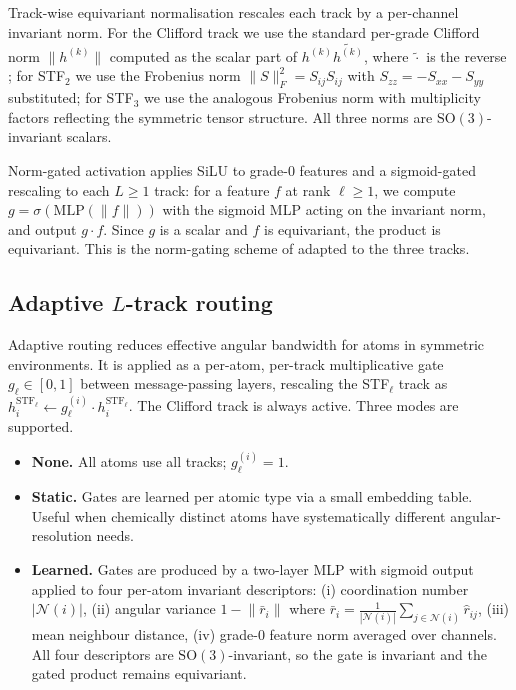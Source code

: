 Track-wise equivariant normalisation rescales each track by a per-channel invariant norm. For the Clifford track we use the standard per-grade Clifford norm $\lVert h^{(k)}\rVert$ computed as the scalar part of $h^{(k)}\widetilde{h^{(k)}}$, where $\widetilde{\cdot}$ is the reverse \citep{doran2003geometric}; for STF$_2$ we use the Frobenius norm $\lVert S\rVert_F^2 = S_{ij}S_{ij}$ with $S_{zz} = -S_{xx}-S_{yy}$ substituted; for STF$_3$ we use the analogous Frobenius norm with multiplicity factors reflecting the symmetric tensor structure. All three norms are $\mathrm{SO}(3)$-invariant scalars.

Norm-gated activation applies SiLU to grade-0 features and a sigmoid-gated rescaling to each $L \geq 1$ track: for a feature $f$ at rank $\ell \geq 1$, we compute $g = \sigma(\mathrm{MLP}(\lVert f\rVert))$ with the sigmoid MLP acting on the invariant norm, and output $g \cdot f$. Since $g$ is a scalar and $f$ is equivariant, the product is equivariant. This is the norm-gating scheme of \citet{weiler20183d,schutt2021painn} adapted to the three tracks.

\subsection{Adaptive \texorpdfstring{$L$}{L}-track routing}\label{supp:routing}

Adaptive routing reduces effective angular bandwidth for atoms in symmetric environments. It is applied as a per-atom, per-track multiplicative gate $g_\ell \in [0, 1]$ between message-passing layers, rescaling the STF$_\ell$ track as $h^{\mathrm{STF}_\ell}_i \leftarrow g_\ell^{(i)} \cdot h^{\mathrm{STF}_\ell}_i$. The Clifford track is always active. Three modes are supported.
\begin{itemize}
    \item \textbf{None.} All atoms use all tracks; $g_\ell^{(i)} = 1$.
    \item \textbf{Static.} Gates are learned per atomic type via a small embedding table. Useful when chemically distinct atoms have systematically different angular-resolution needs.
    \item \textbf{Learned.} Gates are produced by a two-layer MLP with sigmoid output applied to four per-atom invariant descriptors: (i) coordination number $|\mathcal{N}(i)|$, (ii) angular variance $1 - \lVert\bar{r}_i\rVert$ where $\bar{r}_i = \tfrac{1}{|\mathcal{N}(i)|}\sum_{j\in\mathcal{N}(i)}\hat{r}_{ij}$, (iii) mean neighbour distance, (iv) grade-0 feature norm averaged over channels. All four descriptors are $\mathrm{SO}(3)$-invariant, so the gate is invariant and the gated product remains equivariant.
\end{itemize}

